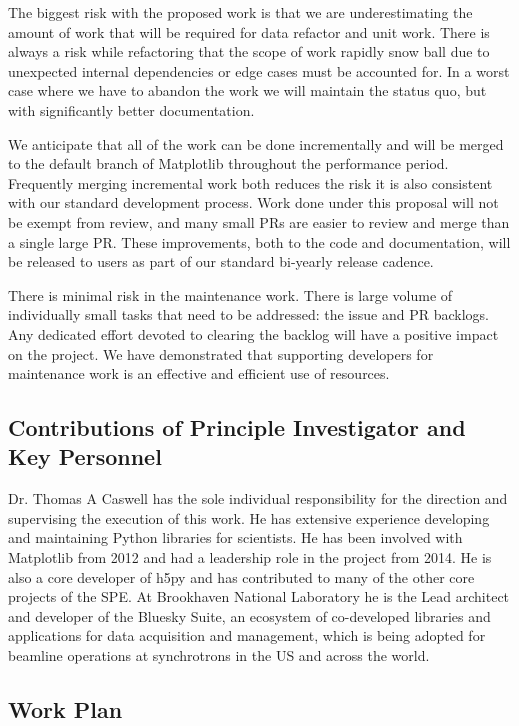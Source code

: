 \documentclass[12pt]{article}
\numberwithin{page}{section}
\begin{document}

The biggest risk with the proposed work is that we are underestimating
the amount of work that will be required for data refactor and unit
work.  There is always a risk while refactoring that the scope of work
rapidly snow ball due to unexpected internal dependencies or edge
cases must be accounted for.  In a worst case where we have to abandon
the work we will maintain the status quo, but with significantly
better documentation.

We anticipate that all of the work can be done incrementally and will
be merged to the default branch of Matplotlib throughout the
performance period.  Frequently merging incremental work both reduces
the risk it is also consistent with our standard development process.
Work done under this proposal will not be exempt from review, and many
small PRs are easier to review and merge than a single large PR.
These improvements, both to the code and documentation, will be
released to users as part of our standard bi-yearly release cadence.

There is minimal risk in the maintenance work.  There is large volume
of individually small tasks that need to be addressed: the issue and
PR backlogs.  Any dedicated effort devoted to clearing the backlog
will have a positive impact on the project.  We have demonstrated that
supporting developers for maintenance work is an effective and
efficient use of resources.


\subsection{Contributions of Principle Investigator and Key Personnel}

Dr. Thomas A Caswell has the sole individual responsibility for the
direction and supervising the execution of this work.  He has
extensive experience developing and maintaining Python libraries for
scientists.  He has been involved with Matplotlib from 2012 and had a
leadership role in the project from 2014.  He is also a core developer
of h5py and has contributed to many of the other core projects of the
SPE.  At Brookhaven National Laboratory he is the Lead architect and
developer of the Bluesky Suite, an ecosystem of co-developed libraries
and applications for data acquisition and management, which is being
adopted for beamline operations at synchrotrons in the US and across
the world.


\subsection{Work Plan}
\end{document}
